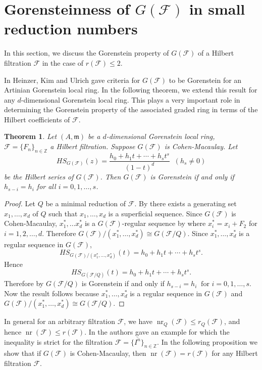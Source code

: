 \documentclass[12pt]{amsart}
\newtheorem{thm}{Theorem}[section]
\theoremstyle{definition}
\theoremstyle{remark}
\numberwithin{equation}{section}
\newcommand{\bbZ}{\ensuremath{\mathbb Z}}
\newcommand{\m}{{\mathfrak m}}
\DeclareMathOperator{\nr}{{nr}}
\newcommand{\FF}{\mathcal{F}}
\begin{document}
\section{Gorensteinness of $G(\FF)$ in small reduction numbers}
\label{sec:GF Gor dim1}
\par 
In this section, we discuss the Gorenstein property of $G(\FF)$ of a Hilbert filtration $\FF$ in the case of $r(\FF) \le 2$. 
\par 
In \cite{HKU} Heinzer, Kim and Ulrich gave criteria for 
$G(\FF)$ to be Gorenstein for an Artinian Gorenstein local ring. 
In the following theorem, we extend this result for any 
$d$-dimensional Gorenstein local ring. 
This plays a very important role in determining the Gorenstein 
property of the associated graded ring in terms of 
the Hilbert coefficients of $\FF$.

\begin{thm} \label{thm:GoriffhVectorCondition}
Let $(A,\m)$ be a $d$-dimensional Gorenstein local ring, $\mathcal{F}=\{F_n\}_{n\in \mathbb{Z}}$ a Hilbert filtration. 
Suppose $G(\FF)$ is Cohen-Macaulay. 
Let
\[
HS_{G(\mathcal{F})}(z)=\frac{h_0+h_1t+\cdots+h_st^s}{(1-t)^d} \;\;
(h_s \ne 0)
\]
be the Hilbert series of $G(\FF)$.
Then $G(\FF)$ is Gorenstein if and only if $h_{s-i}=h_i$ for all $i=0,1,\ldots ,s$. 
\end{thm}

\begin{proof}
Let $Q$ be a minimal reduction of $\FF$. 
By \cite[Theorem 8.6.3]{HS06} there exists a generating set 
$x_1,\ldots,x_d$ of $Q$ such that $x_1,\ldots,x_d$ is a superficial sequence. 
Since $G(\FF)$ is Cohen-Macaulay, 
$x_1^*,\ldots x_d^*$ is a $G(\FF)$-regular sequence 
by \cite[Lemma 2.1]{HucMar} where $x_i^*=x_i+F_2$ 
for $i=1,2,\ldots ,d$. 
Therefore $G(\FF)/(x_1^*,\ldots ,x_d^*)\cong G(\FF/Q)$. 
Since $x_1^*,\ldots, x_d^*$ is a regular sequence in $G(\FF)$,
\[
HS_{G(\FF)/(x_1^*,\ldots, x_d^*)}(t)=h_0+h_1t+\cdots+h_st^s.
\]
Hence
\[
HS_{G(\FF/Q)}(t)=h_0+h_1t+\cdots+h_st^s.
\]
Therefore by \cite[Theorem 4.2]{HKU} $G(\FF/Q)$ is Gorenstein 
if and only if  $h_{s-i}=h_i ~\textrm{ for } i=0,1,\ldots,s$.
Now the result follows because $x_1^*,\ldots, x_d^*$ is 
a regular sequence in $G(\FF)$ and 
$G(\FF)/(x_1^*,\ldots ,x_d^*)\cong G(\FF/Q)$. 
\end{proof}

\par 
In general for an arbitrary filtration $\FF$, we have $\nr_Q(\mathcal{F})\leq r_Q(\mathcal{F})$, 
and hence $\nr(\FF) \leq r(\FF)$. In \cite[Example 2.8]{ORWY2022} 
the authors gave an example for which the inequality is 
strict for the filtration $\FF=\{\overline{I^n}\}_{n \in \bbZ}$.  
In the following proposition we show that if $G(\FF)$ is Cohen-Macaulay, 
then $\nr(\FF) = r(\FF)$ for any Hilbert filtration $\FF$. 
\end{document}
